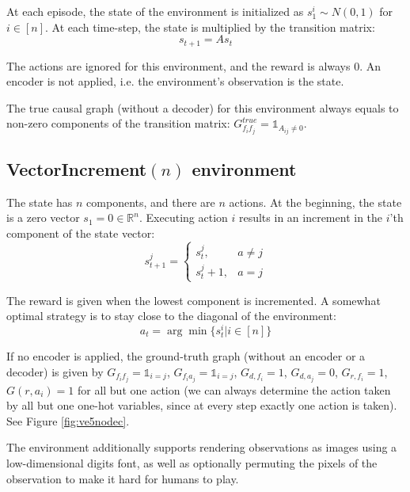 \documentclass[a4paper,11pt,oneside]{report}
\begin{document}
At each episode, the state of the environment is initialized as $s_1^i\sim N(0,1)$ for $i\in[n]$. At each time-step, the state is multiplied by the transition matrix:
$$
s_{t+1}=As_t
$$

The actions are ignored for this environment, and the reward is always $0$. An encoder is not applied, i.e. the environment's observation is the state.

The true causal graph (without a decoder) for this environment always equals to non-zero components of the transition matrix: $G^{true}_{f_if_j}=\mathds 1_{A_{ij}\neq 0}$.

\subsection{VectorIncrement$(n)$ environment}
The state has $n$ components, and there are $n$ actions. At the beginning, the state is a zero vector $s_1=0\in\mathbb R^n$. Executing action $i$ results in an increment in the $i$'th component of the state vector:
$$
s^j_{t+1}=\begin{cases}
s^j_t,&a\neq j\\
s^j_t+1,&a=j
\end{cases}
$$

The reward is given when the lowest component is incremented. A somewhat optimal strategy is to stay close to the diagonal of the environment:
$$
a_t=\arg\min \{s_t^i\big| i\in[n]\}
$$

If no encoder is applied, the ground-truth graph (without an encoder or a decoder) is given by $G_{f_if_j}=\mathds 1_{i=j}$, $G_{f_ia_j}=\mathds 1_{i=j}$, $G_{d,f_i}=1$, $G_{d,a_j}=0$, $G_{r,f_i}=1$, $G(r,a_i)=1$ for all but one action (we can always determine the action taken by all but one one-hot variables, since at every step exactly one action is taken). See Figure \ref{fig:ve5nodec}.

The environment additionally supports rendering observations as images using a low-dimensional digits font, as well as optionally permuting the pixels of the observation to make it hard for humans to play.
\end{document}
